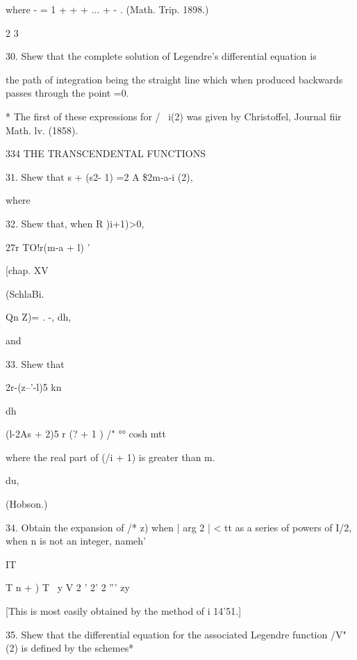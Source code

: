 {{{{where - = 1 + + + ... + - . (Math. Trip. 1898.)

2 3

30. Shew that the complete solution of Legendre's differential
equation is

the path of integration being the straight line which when produced
backwards passes through the point =0.

* The first of these expressions for / \ i(2) was given by
Christoffel, Journal fiir Math. lv. (1858).



334 THE TRANSCENDENTAL FUNCTIONS

31. Shew that s + (s2- 1) =2 A \$2m-a-i (2),

where

32. Shew that, when R )i+1)>0,



27r TO!r(m-a + l) '



[chap. XV



(SchlaBi.



Qn Z)= . -, dh,



and



33. Shew that




 2r-(z--'-l)5 kn



dh



(l-2As + 2)5 r (? + 1 ) /" °° cosh mtt






where the real part of (/i + 1) is greater than m.



du,



(Hobson.)



34. Obtain the expansion of /* z) when | arg 2 | < tt as a series of
powers of I/2, when n is not an integer, nameh'

IT

T n + ) T \ y V 2 ' 2' 2 ''' zy

[This is most easily obtained by the method of i 14'51.]

35. Shew that the differential equation for the associated Legendre
function /V" (2) is defined by the schemes*



}}}}
